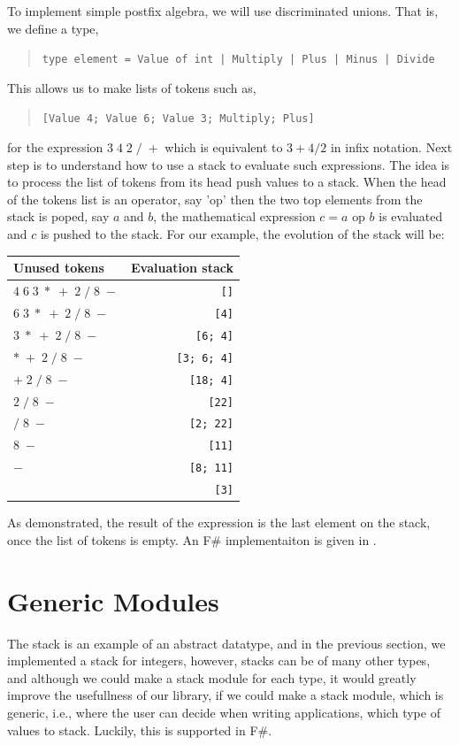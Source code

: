 \documentclass[fsharpNotes.tex]{subfiles}
\begin{document}
To implement simple postfix algebra, we will use discriminated unions. That is, we define a type,
\begin{quote}
\lstinline{type element = Value of int | Multiply | Plus | Minus | Divide}
\end{quote}
This allows us to make lists of tokens such as,
\begin{quote}
\lstinline{[Value 4; Value 6; Value 3; Multiply; Plus]}
\end{quote}
for the expression $3\; 4\; 2\; /\; +$ which is equivalent to $3+4/2$ in infix notation. Next step is to understand how to use a stack to evaluate such expressions. The idea is to process the list of tokens from its head push values to a stack. When the head of the tokens list is an operator, say 'op' then the two top elements from the stack is poped, say $a$ and $b$, the mathematical expression $c = a\text{ op }b$ is evaluated and $c$ is pushed to the stack. For our example, the evolution of the stack will be:
\begin{center}
  \begin{tabular}{l|r}
  Unused tokens &  Evaluation stack\\\hline
  $4\; 6\; 3\; *\; +\; 2\; /\; 8\; -$ & \lstinline![]! \\
  $6\; 3\; *\; +\; 2\; /\; 8\; -$ & \lstinline![4]! \\
  $3\; *\; +\; 2\; /\; 8\; -$ & \lstinline![6; 4]! \\
  $*\; +\; 2\; /\; 8\; -$ & \lstinline![3; 6; 4]! \\
  $+\; 2\; /\; 8\; -$ & \lstinline![18; 4]! \\
  $2\; /\; 8\; -$ & \lstinline![22]! \\
  $/\; 8\; -$ & \lstinline![2; 22]! \\
  $8\; -$ & \lstinline![11]! \\
  $-$ & \lstinline![8; 11]! \\
   & \lstinline![3]! \\
\end{tabular}
\end{center}
As demonstrated, the result of the expression is the last element on the stack, once the list of tokens is empty. An F\# implementaiton is given in .

\section{Generic Modules}
\label{sec:genericModule}
The stack is an example of an abstract datatype, and in the previous section, we implemented a stack for integers, however, stacks can be of many other types, and although we could make a stack module for each type, it would greatly improve the usefullness of our library, if we could make a stack module, which is generic, i.e., where the user can decide when writing applications, which type of values to stack. Luckily, this is supported in F\#.
\end{document}
